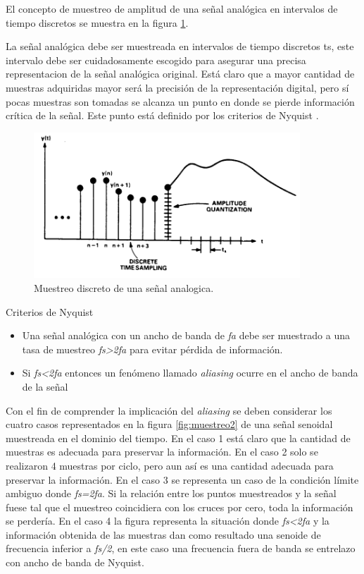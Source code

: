 El concepto de muestreo de amplitud de una señal analógica en intervalos de tiempo discretos se muestra en la figura \ref{fig:muestreo1}.

La señal analógica debe ser muestreada en intervalos de tiempo discretos ts, este intervalo debe ser cuidadosamente escogido para asegurar una precisa representacion de la señal analógica original. Está claro que a mayor cantidad de muestras adquiridas mayor será la precisión de la representación digital, pero sí pocas muestras son tomadas se alcanza un punto en donde se pierde información crítica de la señal. Este punto está definido por los criterios de Nyquist \citep{sampling:appnote}.

\begin{figure}[ht]
	\centering
	\includegraphics[width=100mm]{./Figures/muestreo1.png}
	\caption{Muestreo discreto de una señal analogica.}
	\label{fig:muestreo1}
\end{figure}

Criterios de Nyquist
\begin{itemize}
\item Una señal analógica con un ancho de banda de \textit{fa} debe ser muestrado a una tasa de muestreo \textit{fs>2fa} para evitar pérdida de información.
\item Si \textit{fs<2fa} entonces un fenómeno llamado \textit{aliasing} ocurre en el ancho de banda de la señal
\end{itemize}

Con el fin de comprender la implicación del \textit{aliasing} se deben considerar los cuatro casos representados en la figura \ref{fig:muestreo2} de una señal senoidal muestreada en el dominio del tiempo.
En el caso 1 está claro que la cantidad de muestras es adecuada para preservar la información. En el caso 2 solo se realizaron 4 muestras por ciclo, pero aun así es una cantidad adecuada para preservar la información. En el caso 3 se representa un caso de la condición límite ambiguo donde \textit{fs=2fa}. Si la relación entre los puntos muestreados y la señal fuese tal que el muestreo coincidiera con los cruces por cero, toda la información se perdería. En el caso 4 la figura representa la situación donde \textit{fs<2fa} y la información obtenida de las muestras dan como resultado una senoide de frecuencia inferior a \textit{fs/2}, en este caso una frecuencia fuera de banda se entrelazo con ancho de banda de Nyquist. 

